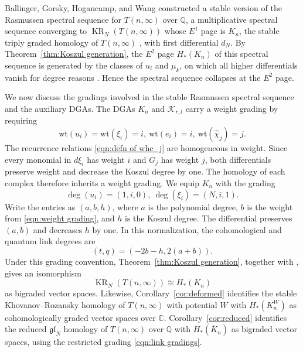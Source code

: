 \documentclass[reqno]{amsart}
\theoremstyle{definition}
\theoremstyle{remark}
\newcommand{\QQ}{\mathbb{Q}}
\newcommand{\gl}{\mathfrak{gl}}
\newcommand{\cak}{\mathcal{K}}
\newcommand{\whc}{\widehat{\chi}}
\DeclareMathOperator{\degg}{deg}
\DeclareMathOperator{\KR}{KR}
\begin{document}
Ballinger, Gorsky, Hogancamp, and Wang \cite[Theorem~1.1]{ballinger2025stable} constructed a stable version of the Rasmussen spectral sequence \cite{rasmussen2015differentials} for $T(n,\infty)$ over $\QQ$, a multiplicative spectral sequence converging to $\KR_N(T(n,\infty))$ whose $E^1$ page is $K_n$, the stable triply graded homology of $T(n,\infty)$ \cite{hogancamp2018stable},  with first differential $d_N$. By Theorem~\ref{thm:Koszul generation}, the $E^2$ page $H_*(K_n)$ of this spectral sequence is generated by the classes of $u_i$ and $\mu_k$, on which all higher differentials vanish for degree reasons \cite[Theorem~7.5]{ballinger2025stable}. Hence the spectral sequence collapses at the $E^2$ page.

We now discuss the gradings involved in the stable Rasmussen spectral sequence and the auxiliary DGAs. The DGAs $K_n$ and $\cak_{r,l}$ carry a weight grading by requiring
\begin{equation}\label{eqn:weight grading}
\mathrm{wt}(u_i)=\mathrm{wt}(\xi_i)=i,\ \mathrm{wt}(e_i)=i,\ \mathrm{wt}(\whc_j)=j.
\end{equation}
The recurrence relations \eqref{eqn:defn of whc_j} are homogeneous in weight. Since every monomial in $d\xi_i$ has weight $i$ and $G_j$ has weight $j$, both differentials preserve weight and decrease the Koszul degree by one. The homology of each complex therefore inherits a weight grading. We equip $K_n$ with the grading
\[\degg(u_i)=(1,i,0),\ \degg(\xi_i)=(N,i,1).\]
Write the entries as $(a,b,h)$, where $a$ is the polynomial degree, $b$ is the weight from \eqref{eqn:weight grading}, and $h$ is the Koszul degree. The differential preserves $(a,b)$ and decreases $h$ by one. In this normalization, the cohomological and quantum link degrees are \begin{equation}\label{eqn:link gradings}
    (t,q)=(-2b-h,2(a+b)).
\end{equation}Under this grading convention, Theorem~\ref{thm:Koszul generation}, together with \cite[Theorems 1.1 and 7.5]{ballinger2025stable}, gives an isomorphism \begin{equation}\label{eqn:KRN iso to Koszul}
    \KR_N(T(n,\infty))\cong H_*(K_n)
\end{equation}as bigraded vector spaces. Likewise, Corollary~\ref{cor:deformed} identifies the stable Khovanov--Rozansky homology of $T(n,\infty)$ with potential $W$ with $H_*(K_n^W)$ as cohomologically graded vector spaces over $\mathbb C$. Corollary~\ref{cor:reduced} identifies the reduced $\gl_N$ homology of $T(n,\infty)$ over $\QQ$ with $H_*(\overline K_n)$ as bigraded vector spaces, using the restricted grading \eqref{eqn:link gradings}. %
\end{document}
